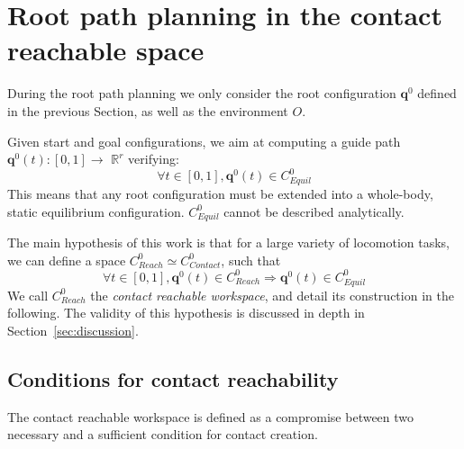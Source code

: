\documentclass[journal]{IEEEtran}
\newcommand{\gls}[1]{\textit{#1}}
\providecommand{\DIFaddtex}[1]{#1} %
\providecommand{\DIFdeltex}[1]{} %
\providecommand{\DIFaddbegin}{\protect\color{blue}} %
\providecommand{\DIFaddend}{\protect\color{black}} %
\providecommand{\DIFdelbegin}{\protect\cbdelete} %
\providecommand{\DIFdelend}{} %
\providecommand{\DIFadd}[1]{\texorpdfstring{\DIFaddtex{#1}}{#1}} %
\providecommand{\DIFdel}[1]{\texorpdfstring{\DIFdeltex{#1}}{}} %
\begin{document}
\section{Root path planning in the contact reachable space}
\label{rbprm}

During the root path planning we only consider the root configuration $\mathbf{q}^0$ defined in the previous Section,
as well as the environment $O$.

Given \DIFdelbegin \DIFdel{a start and a }\DIFdelend \DIFaddbegin \DIFadd{start and }\DIFaddend goal configurations, we aim at computing a guide path $\mathbf{q}^0(t) : [0,1] \longrightarrow$ $\mathbb{R}^r$ verifying:
\begin{equation*} \label{eq:path}
\forall t \in [0,1], \mathbf{q}^0(t)  \in C_{Equil}^0
\end{equation*}
This means that any root configuration must be extended into a whole-body, static equilibrium configuration.
$C_{Equil}^0$  cannot be described analytically.

The \DIFdelbegin \DIFdel{strong }\DIFdelend \DIFaddbegin \DIFadd{main }\DIFaddend hypothesis of this work is that for a large variety of locomotion tasks, we can define a space  $C_{Reach}^0 \simeq C_{Contact}^0$, such that 
\begin{equation} \label{eq:creach}
\forall t \in [0,1], \mathbf{q}^0(t) \in C_{Reach}^0 \Rightarrow \mathbf{q}^0(t)  \in C_{Equil}^0
\end{equation}
We call  $C_{Reach}^0$ the \textit{contact reachable workspace}, and detail its construction in the following.
The validity of this hypothesis is discussed in depth in Section~\ref{sec:discussion}.

\subsection{Conditions for contact reachability}
The contact reachable workspace is defined as a compromise between two necessary and a sufficient condition for contact creation.
\end{document}
